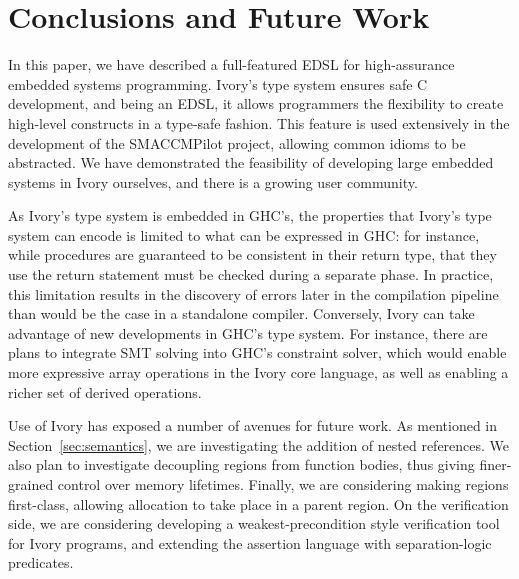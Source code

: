 \section{Conclusions and Future Work}
\label{sec:conclusion}

In this paper, we have described a full-featured EDSL for high-assurance
embedded systems programming. Ivory's type system ensures safe C development,
and being an EDSL, it allows programmers the flexibility to create high-level
constructs in a type-safe fashion. This feature is used extensively in the
development of the SMACCMPilot project, allowing common idioms to be abstracted.
We have demonstrated the feasibility of developing large embedded systems in
Ivory ourselves, and there is a growing user community.

As Ivory's type system is embedded in GHC's, the properties that Ivory's type
system can encode is limited to what can be expressed in GHC: for instance,
while procedures are guaranteed to be consistent in their return type, that they
use the return statement must be checked during a separate phase.  In practice,
this limitation results in the discovery of errors later in the compilation
pipeline than would be the case in a standalone compiler.  Conversely, Ivory can
take advantage of new developments in GHC's type system.  For instance, there
are plans to integrate SMT solving into GHC's constraint solver, which would
enable more expressive array operations in the Ivory core language, as well as
enabling a richer set of derived operations.

Use of Ivory has exposed a number of avenues for future work. As mentioned in
Section~\autoref{sec:semantics}, we are investigating the addition of nested
references.  We also plan to investigate decoupling regions from function
bodies, thus giving finer-grained control over memory lifetimes.  Finally, we
are considering making regions first-class, allowing allocation to take place in
a parent region.  On the verification side, we are considering developing a
weakest-precondition style verification tool for Ivory programs, and extending
the assertion language with separation-logic predicates.
